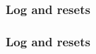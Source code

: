 \documentclass{beamer}
\begin{document}
    \begin{frame}
        \frametitle{Log and resets}
        \begin{figure}[H]
            \centering
            \noindent
        \end{figure}
    \end{frame}
    \begin{frame}
        \frametitle{Log and resets}
        \begin{figure}[H]
            \centering
            \noindent
        \end{figure}
    \end{frame}
\end{document}
